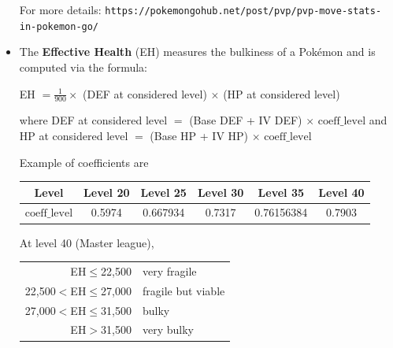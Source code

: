 \documentclass[8pt,aspectratio=169,compress]{beamer}
\begin{document}
\begin{frame}
\begin{block}{}
\begin{tiny}
\begin{itemize}
 For more details: \texttt{https://pokemongohub.net/post/pvp/pvp-move-stats-in-pokemon-go/}
 
 \item The \textbf{Effective Health} (EH) measures the bulkiness of a Pok\'emon and is computed via the formula:
\begin{center}
EH $= \frac{1}{900} \times$ (DEF at considered level) $\times$ (HP at considered level) 
\end{center}

where DEF at considered level $=$ (Base DEF + IV DEF) $\times$ $\text{coeff}\_\text{level}$ and HP at considered level $=$ (Base HP + IV HP) $\times$ $\text{coeff}\_\text{level}$

Example of coefficients are

\begin{center}
\begin{tabular}{cccccc} 
Level &   Level 20 &  Level 25 &  Level 30 &  Level 35 &  Level 40 \\ \hline
$\text{coeff}\_\text{level}$ &   0.5974 & 0.667934 & 0.7317 & 0.76156384 & 0.7903 \\
\end{tabular}   
\end{center}

At level 40 (Master league),

\begin{center}
\begin{tabular}{rl}
EH$\leq$22,500  & very fragile \\
22,500$<$EH$\leq$27,000  & fragile but viable \\
27,000$<$EH$\leq$31,500  & bulky \\
EH$>$31,500  & very bulky \\
\end{tabular}
\end{center}

\end{itemize}
\end{tiny}
\end{block}
\end{frame}
\end{document}
